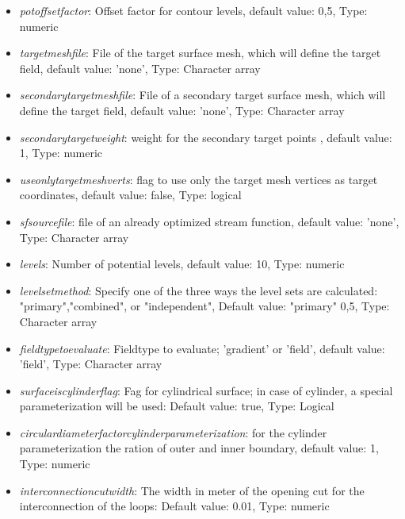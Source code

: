 \documentclass[a4paper,12pt]{book}
\begin{document}
\begin{itemize}
	\item  \textit{pot\textunderscore offset\textunderscore factor}: Offset factor for contour levels, default value: 0,5, Type: numeric
	\item  \textit{target\textunderscore mesh\textunderscore file}: File of the target surface mesh, which will define the target field, default value: 'none', Type: Character array
	\item  \textit{ secondary\textunderscore target\textunderscore mesh\textunderscore file}:  File of a secondary target surface mesh, which will define the target field, default value: 'none', Type: Character array
	\item  \textit{secondary\textunderscore target\textunderscore weight}: weight for the secondary target points , default value: 1, Type: numeric
	\item  \textit{use\textunderscore only\textunderscore target\textunderscore mesh\textunderscore verts}: flag to use only the target mesh vertices as target coordinates, default value: false, Type: logical
	\item  \textit{sf\textunderscore source\textunderscore file}: file of an already optimized stream function, default value: 'none', Type: Character array
	\item  \textit{levels}: Number of potential levels, default value: 10, Type: numeric
	\item  \textit{level\textunderscore set\textunderscore method}: Specify one of the three ways the level sets are calculated:
	"primary","combined", or "independent", Default value: "primary" 0,5, Type: Character array
	\item  \textit{fieldtype\textunderscore to\textunderscore evaluate}: Fieldtype to evaluate; 'gradient' or 'field', default value: 'field', Type: Character array
	\item  \textit{surface\textunderscore is\textunderscore cylinder\textunderscore flag}: Fag for cylindrical surface; in case of cylinder, a special parameterization will be used: Default value: true, Type: Logical
	\item  \textit{circular\textunderscore diameter\textunderscore factor\textunderscore cylinder\textunderscore parameterization}: for the cylinder parameterization the ration of outer and inner boundary, default value: 1, Type: numeric
	\item  \textit{interconnection\textunderscore cut\textunderscore width}: The width in meter of the opening cut for the interconnection of the loops: Default value: 0.01, Type: numeric

\end{itemize}
\end{document}
